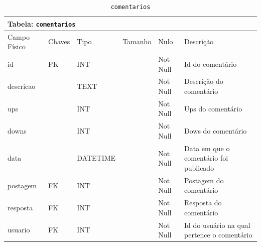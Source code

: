 \documentclass[12pt,a4paper]{article}
\begin{document}
\begin{center}
\begin{table}[h!]
	\caption{\texttt{comentarios}}
	\label{tabela:comentarios}
	\begin{tabular}{|p{2.3cm}|p{1.2cm}|p{1.8cm}|p{1.5cm}|p{1cm}|p{6cm}|}\hline	
		\multicolumn{6}{|p{16cm}|}{\cellcolor{cinzaClaro}  \centering Tabela: \texttt{comentarios}} \\ \hline %
		{\small Campo Físico}   & {\small Chaves} & {\small Tipo} & {\small Tamanho} & {\small Nulo} & {\small Descrição}\\\hline %
		
		{\tiny id} & {\tiny PK} & {\tiny INT} & {\tiny } & {\tiny Not Null} &{\tiny Id do comentário  }\\\hline
		{\tiny descricao} & {\tiny } & {\tiny TEXT} & {\tiny } & {\tiny Not Null} &{\tiny Descrição do comentário }\\\hline		
		{\tiny ups} & {\tiny } & {\tiny INT} & {\tiny } & {\tiny Not Null} &{\tiny Ups do comentário }\\\hline
		{\tiny downs} & {\tiny } & {\tiny INT} & {\tiny } & {\tiny Not Null} &{\tiny Dows do comentário }\\\hline		
		{\tiny data} & {\tiny } & {\tiny DATETIME} & {\tiny } & {\tiny Not Null} &{\tiny Data em que o comentário foi publicado }\\\hline
		{\tiny postagem} & {\tiny FK} & {\tiny INT} & {\tiny } & {\tiny Not Null} &{\tiny Postagem do comentário}\\\hline
		{\tiny resposta} & {\tiny FK} & {\tiny INT} & {\tiny } & {\tiny Not Null} &{\tiny Resposta do comentário}\\\hline
		{\tiny usuario} & {\tiny FK} & {\tiny INT} & {\tiny } & {\tiny Not Null} &{\tiny Id do usuário na qual pertence o comentário}\\\hline
		
			
	\end{tabular}
\end{table}	
\end{center}
\end{document}
